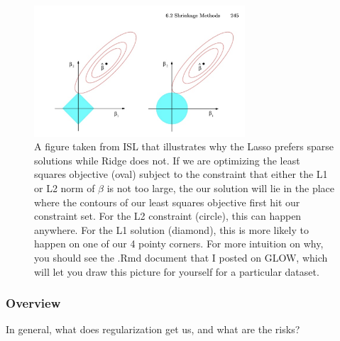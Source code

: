 \begin{figure}
\centering
	\includegraphics[width=0.7\textwidth]{442_lecs/magicpic.png}
	\caption{A figure taken from ISL that illustrates why the Lasso prefers sparse solutions while Ridge does not. If we are optimizing the least squares objective (oval) subject to the constraint that either the L1 or L2 norm of $\beta$ is not too large, the our solution will lie in the place where the contours of our least squares objective first hit our constraint set. For the L2 constraint (circle), this can happen anywhere. For the L1 solution (diamond), this is more likely to happen on one of our 4 pointy corners. For more intuition on why, you should see the .Rmd document that I posted on GLOW, which will let you draw this picture for yourself for a particular dataset.}
	\label{fig_lassoridge}
\end{figure}


\subsubsection{Overview}

In general, what does regularization get us, and what are the risks?

